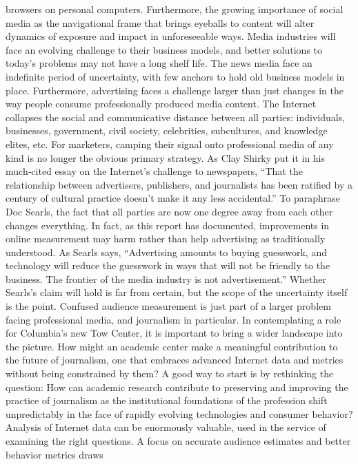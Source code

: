 browsers on personal computers. Furthermore, the growing importance of
social media as the navigational frame that brings eyeballs to content will
alter dynamics of exposure and impact in unforeseeable ways. Media
industries will face an evolving challenge to their business models, and
better solutions to today’s problems may not have a long shelf life.
The news media face an indefinite period of uncertainty, with few anchors
to hold old business models in place. Furthermore, advertising faces a
challenge larger than just changes in the way people consume
professionally produced media content. The Internet collapses the social
and communicative distance between all parties: individuals, businesses,
government, civil society, celebrities, subcultures, and knowledge elites,
etc. For marketers, camping their signal onto professional media of any
kind is no longer the obvious primary strategy. As Clay Shirky put it in
his much‐cited essay on the Internet’s challenge to newspapers, ``That the
relationship between advertisers, publishers, and journalists has been
ratified by a century of cultural practice doesn’t make it any less
accidental.''
To paraphrase Doc Searls, the fact that all parties are now one degree
away from each other changes everything. In fact, as this report has
documented, improvements in online measurement may harm rather than
help advertising as traditionally understood. As Searls says, ``Advertising
amounts to buying guesswork, and technology will reduce the guesswork
in ways that will not be friendly to the business. The frontier of the media
industry is not advertisement.''
Whether Searls’s claim will hold is far from certain, but the scope of the
uncertainty itself is the point. Confused audience measurement is just part
of a larger problem facing professional media, and journalism in
particular. In contemplating a role for Columbia’s new Tow Center, it is
important to bring a wider landscape into the picture. How might an
academic center make a meaningful contribution to the future of
journalism, one that embraces advanced Internet data and metrics without
being constrained by them?
A good way to start is by rethinking the question: How can academic
research contribute to preserving and improving the practice of
journalism as the institutional foundations of the profession shift
unpredictably in the face of rapidly evolving technologies and consumer
behavior? Analysis of Internet data can be enormously valuable, used in
the service of examining the right questions.
A focus on accurate audience estimates and better behavior metrics draws
